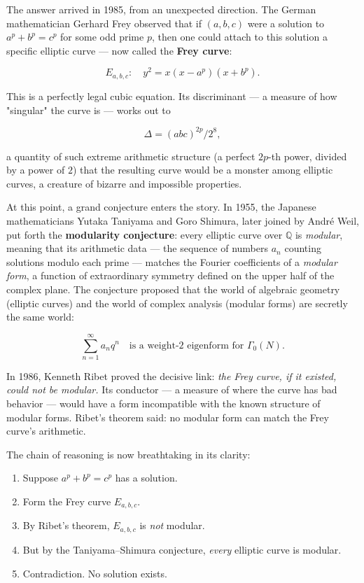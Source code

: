 \documentclass[11pt,twoside,openright]{book}
\theoremstyle{definition}
\theoremstyle{remark}
\begin{document}
The answer arrived in 1985, from an unexpected direction. The German mathematician Gerhard Frey observed that if $(a, b, c)$ were a solution to $a^p + b^p = c^p$ for some odd prime $p$, then one could attach to this solution a specific elliptic curve --- now called the \textbf{Frey curve}:

\[E_{a,b,c} : \quad y^2 = x(x - a^p)(x + b^p).\]

This is a perfectly legal cubic equation. Its discriminant --- a measure of how "singular" the curve is --- works out to

\[\Delta = (abc)^{2p} / 2^8,\]

a quantity of such extreme arithmetic structure (a perfect $2p$-th power, divided by a power of $2$) that the resulting curve would be a monster among elliptic curves, a creature of bizarre and impossible properties.

At this point, a grand conjecture enters the story. In 1955, the Japanese mathematicians Yutaka Taniyama and Goro Shimura, later joined by Andr\'e Weil, put forth the \textbf{modularity conjecture}: every elliptic curve over $\mathbb{Q}$ is \textit{modular}, meaning that its arithmetic data --- the sequence of numbers $a_n$ counting solutions modulo each prime --- matches the Fourier coefficients of a \textit{modular form}, a function of extraordinary symmetry defined on the upper half of the complex plane. The conjecture proposed that the world of algebraic geometry (elliptic curves) and the world of complex analysis (modular forms) are secretly the same world:

\[\sum_{n=1}^{\infty} a_n q^n \quad \text{is a weight-2 eigenform for } \Gamma_0(N).\]

In 1986, Kenneth Ribet proved the decisive link: \textit{the Frey curve, if it existed, could not be modular.} Its conductor --- a measure of where the curve has bad behavior --- would have a form incompatible with the known structure of modular forms. Ribet's theorem said: no modular form can match the Frey curve's arithmetic.

The chain of reasoning is now breathtaking in its clarity:

\begin{enumerate}
  \item Suppose $a^p + b^p = c^p$ has a solution.
  \item Form the Frey curve $E_{a,b,c}$.
  \item By Ribet's theorem, $E_{a,b,c}$ is \textit{not} modular.
  \item But by the Taniyama--Shimura conjecture, \textit{every} elliptic curve is modular.
  \item Contradiction. No solution exists.
\end{enumerate}
\end{document}
